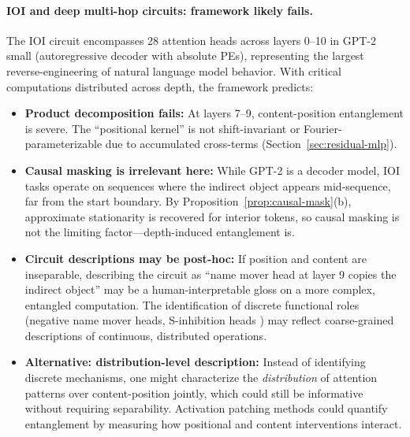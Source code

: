 \documentclass[11pt]{article}
\theoremstyle{definition}
\begin{document}
\paragraph{IOI and deep multi-hop circuits: framework likely fails.}
The IOI circuit \cite{wang2023interpretability} encompasses 28 attention heads across layers 0--10 in GPT-2 small (autoregressive decoder with absolute PEs), representing the largest reverse-engineering of natural language model behavior. With critical computations distributed across depth, the framework predicts:
\begin{itemize}
    \item \textbf{Product decomposition fails:} At layers 7--9, content-position entanglement is severe. The ``positional kernel'' is not shift-invariant or Fourier-parameterizable due to accumulated cross-terms (Section~\ref{sec:residual-mlp}).
    \item \textbf{Causal masking is irrelevant here:} While GPT-2 is a decoder model, IOI tasks operate on sequences where the indirect object appears mid-sequence, far from the start boundary. By Proposition~\ref{prop:causal-mask}(b), approximate stationarity is recovered for interior tokens, so causal masking is not the limiting factor---depth-induced entanglement is.
    \item \textbf{Circuit descriptions may be post-hoc:} If position and content are inseparable, describing the circuit as ``name mover head at layer 9 copies the indirect object'' may be a human-interpretable gloss on a more complex, entangled computation. The identification of discrete functional roles (negative name mover heads, S-inhibition heads \cite{mcdougall2024copysuppression}) may reflect coarse-grained descriptions of continuous, distributed operations.
    \item \textbf{Alternative: distribution-level description:} Instead of identifying discrete mechanisms, one might characterize the \emph{distribution} of attention patterns over content-position jointly, which could still be informative without requiring separability. Activation patching methods \cite{heimersheim2024patching} could quantify entanglement by measuring how positional and content interventions interact.
\end{itemize}
\end{document}
